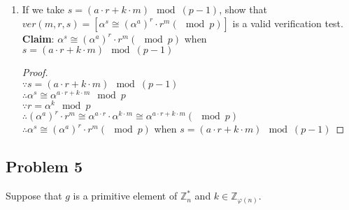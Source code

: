 \documentclass[paper=a4, fontsize=11pt]{scrartcl} %
\numberwithin{equation}{section} %
\numberwithin{figure}{section} %
\newcommand{\problem}[1]{\subsection *{Problem #1}}
\newcommand{\claim}{\textbf{Claim}: }
\newcommand{\pnl}{$ $\newline\\}
\newcommand{\Z}{\mathbb{Z}}
\begin{document}
\begin{enumerate}
\item If we take $s = ( a\cdot r + k\cdot m) \mod (p-1)$, show that
$ver(m, r, s) = [\alpha^s \cong (\alpha^a)^r \cdot r^m (\mod p)]$ is a valid verification test.\\
\claim $\alpha^s \cong (\alpha^a)^r \cdot r^m (\mod p)$ when $s = ( a\cdot r + k\cdot m) \mod (p-1)$\\
\begin{proof}
\pnl
$\because s = ( a\cdot r + k\cdot m) \mod (p-1)$ \\
$\therefore \alpha^s \cong \alpha^{a\cdot r + k\cdot m} \mod p$\\
$\because r = \alpha^k \mod p$ \\
$\therefore (\alpha^a)^r \cdot r^m \cong \alpha^{a\cdot r} \cdot \alpha^{k\cdot m} \cong \alpha^{a\cdot r + k\cdot m} (\mod p)$\\
$\therefore \alpha^s \cong (\alpha^a)^r \cdot r^m (\mod p)$ when $s = ( a\cdot r + k\cdot m) \mod (p-1)$
\end{proof}
\end{enumerate}

\problem 5 
Suppose that $g$ is a primitive element of $\Z^*_n$ and $k \in \Z_{\varphi(n)}$.
\end{document}
